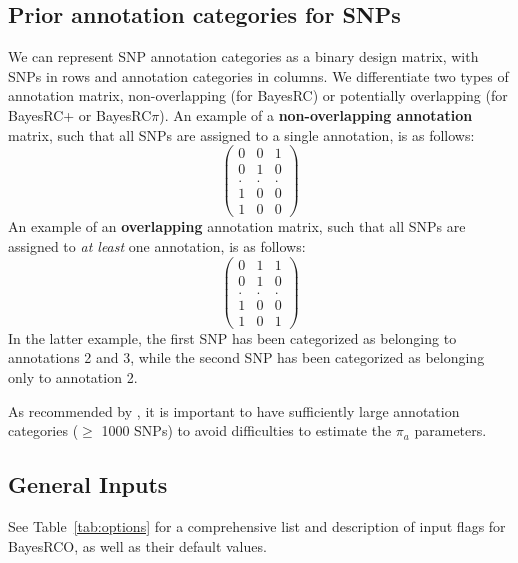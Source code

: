\documentclass{ol-softwaremanual}
\begin{document}
\subsection{Prior annotation categories for SNPs}

We can represent SNP annotation categories as a binary design matrix, with SNPs in rows and annotation categories in columns. We differentiate two types of annotation matrix, non-overlapping (for BayesRC) or potentially overlapping (for BayesRC+ or BayesRC$\pi$). An example of a \textbf{non-overlapping annotation} matrix, such that all SNPs are assigned to a single annotation, is as follows:
\[\begin{pmatrix}
0 & 0 & 1\\
0 & 1 & 0\\
. & . & . \\
1 & 0 & 0 \\
1 & 0 & 0
\end{pmatrix}\]
An example of an \textbf{overlapping} annotation matrix, such that all SNPs are assigned to {\it at least} one annotation, is as follows: 
\[\begin{pmatrix}
0 & 1 & 1\\
0 & 1 & 0\\
. & . & . \\
1 & 0 & 0 \\
1 & 0 & 1
\end{pmatrix}\]
In the latter example, the first SNP has been categorized as belonging to annotations 2 and 3, while the second SNP has been categorized as belonging only to annotation 2.

As recommended by \citet{macleod_exploiting_2016}, it is important to have sufficiently large annotation categories ($\geq$ 1000 SNPs) to avoid difficulties to estimate the $\pi_a$ parameters.

\subsection{General Inputs}

See Table~\ref{tab:options} for a comprehensive list and description of input flags for BayesRCO, as well as their default values.
\end{document}
